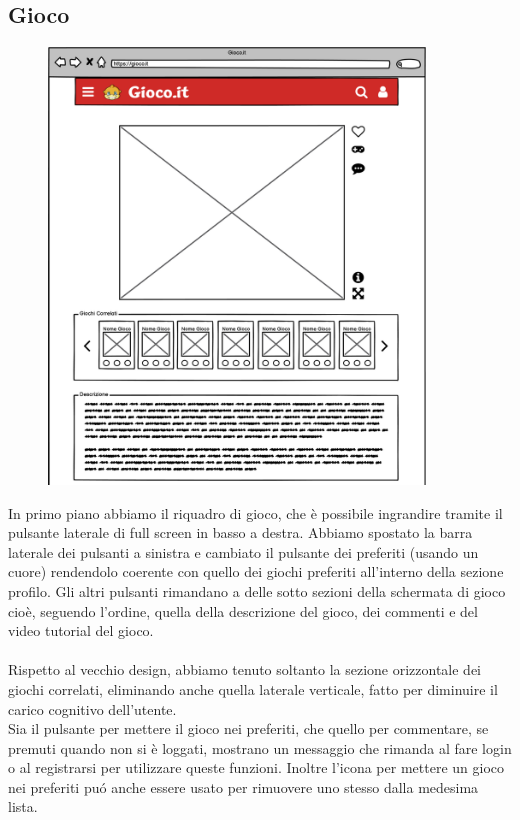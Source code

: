 \documentclass[../Report.tex]{subfiles}
\begin{document}
    \subsection{Gioco}
    \begin{figure}[H]
        \includegraphics[width=10cm]{WGioco_1.png}
        \centering
    \end{figure}
    In primo piano abbiamo il riquadro di gioco, che è possibile ingrandire tramite il pulsante laterale di full screen in basso a destra. Abbiamo spostato la barra laterale dei pulsanti a sinistra e cambiato il pulsante dei preferiti (usando un cuore) rendendolo coerente con quello dei giochi preferiti all'interno della sezione profilo. Gli altri pulsanti rimandano a delle sotto sezioni della schermata di gioco cioè, seguendo l'ordine, quella della descrizione del gioco, dei commenti e del video tutorial del gioco.\\
    \\
    Rispetto al vecchio design, abbiamo tenuto soltanto la sezione orizzontale dei giochi correlati, eliminando anche quella laterale verticale, fatto per diminuire il carico cognitivo dell'utente.\\
    Sia il pulsante per mettere il gioco nei preferiti, che quello per commentare, se premuti quando non si è loggati, mostrano un messaggio che rimanda al fare login o al registrarsi  per utilizzare queste funzioni.
    Inoltre l'icona per mettere un gioco nei preferiti puó anche essere usato per rimuovere uno stesso dalla medesima lista.
\end{document}
